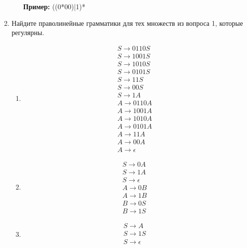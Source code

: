 \documentclass[a4paper]{bmstu}
\begin{document}
\begin{enumerate}
\begin{enumerate}
        \textbf{Пример:} ((0*00)|1)*
    \end{enumerate}
    \item Найдите праволинейные грамматики для тех множеств из вопроса 1, которые регулярны.
    \begin{enumerate}
        \item \begin{equation}
            \begin{split}
                S \to 0110S \\
                S \to 1001S \\
                S \to 1010S \\
                S \to 0101S \\
                S \to 11S \\
                S \to 00S \\
                S \to 1A \\
                A \to 0110A \\
                A \to 1001A \\
                A \to 1010A \\
                A \to 0101A \\
                A \to 11A \\
                A \to 00A \\
                A \to \epsilon
            \end{split}
        \end{equation}
        \item \begin{equation}
            \begin{split}
                S \to 0A \\
                S \to 1A \\
                S \to \epsilon \\
                A \to 0B \\
                A \to 1B \\
                B \to 0S \\
                B \to 1S
            \end{split}
        \end{equation}
        \item \begin{equation}
            \begin{split}
                S \to A \\
                S \to 1S \\
                S \to \epsilon \\

\end{split}
\end{equation}
\end{enumerate}
\end{enumerate}
\end{document}
